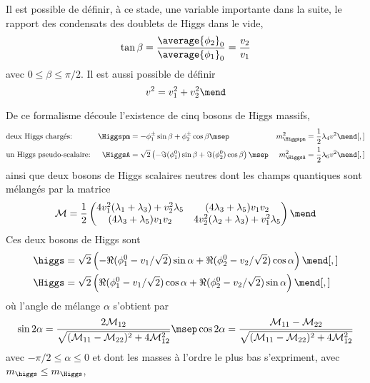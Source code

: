 \par Il est possible de définir, à ce stade, une variable importante dans la suite, le rapport des condensats des doublets de Higgs dans le vide,
\begin{equation}
\tan\beta = \frac{\average{\phi_2}_0}{\average{\phi_1}_0} = \frac{v_2}{v_1}
\label{eq-tan_beta-2HDM}
\end{equation}
avec $0\leq\beta\leq\pi/2$.
Il est aussi possible de définir
\begin{equation}
v^2 = v_1^2+v_2^2
\mend
\end{equation}
\par De ce formalisme découle l'existence de cinq bosons de Higgs massifs,
\begin{align}
&
\text{deux Higgs chargés:}
&
\Higgspm &= - \phi_1^\pm \sin\beta + \phi_2^\pm \cos\beta
\msep&
m_{\Higgspm}^2 &= \frac{1}{2} \lambda_4 v^2
\mend[,]
\\
&
\text{un Higgs pseudo-scalaire:}
&
\HiggsA &= \sqrt{2}\left(-\Im(\phi_1^0)\sin\beta+\Im(\phi_2^0)\cos\beta\right)
\msep&
m_{\HiggsA}^2 &= \frac{1}{2} \lambda_6 v^2
\mend[,]
\end{align}
ainsi que deux bosons de Higgs scalaires neutres dont les champs quantiques sont mélangés par la matrice
\begin{equation}
\mathcal{M} = \frac{1}{2} \begin{pmatrix}
4v_1^2 (\lambda_1+\lambda_3) + v_2^2\lambda_5 & (4\lambda_3+\lambda_5)v_1v_2 \\
(4\lambda_3+\lambda_5)v_1v_2 & 4v_2^2 (\lambda_2+\lambda_3) + v_1^2\lambda_5
\end{pmatrix}
\mend
\end{equation}
Ces deux bosons de Higgs sont
\begin{align}
\higgs &= \sqrt{2}\left(-\Re(\phi_1^0-v_1/\sqrt{2})\sin\alpha+\Re(\phi_2^0-v_2/\sqrt{2})\cos\alpha\right)
\mend[,]
\\
\Higgs &= \sqrt{2}\left(\Re(\phi_1^0-v_1/\sqrt{2})\cos\alpha+\Re(\phi_2^0-v_2/\sqrt{2})\sin\alpha\right)
\mend[,]
\end{align}
où l'angle de mélange $\alpha$ s'obtient par
\begin{equation}
\sin 2\alpha = \frac{2\mathcal{M}_{12}}{\sqrt{(\mathcal{M}_{11}-\mathcal{M}_{22})^2+4\mathcal{M}_{12}^2}}
\msep
\cos 2\alpha = \frac{\mathcal{M}_{11}-\mathcal{M}_{22}}{\sqrt{(\mathcal{M}_{11}-\mathcal{M}_{22})^2+4\mathcal{M}_{12}^2}}
\end{equation}
avec $-\pi/2\leq\alpha\leq0$
et
dont les masses à l'ordre le plus bas s'expriment, avec $m_{\higgs} \leq m_{\Higgs}$,

